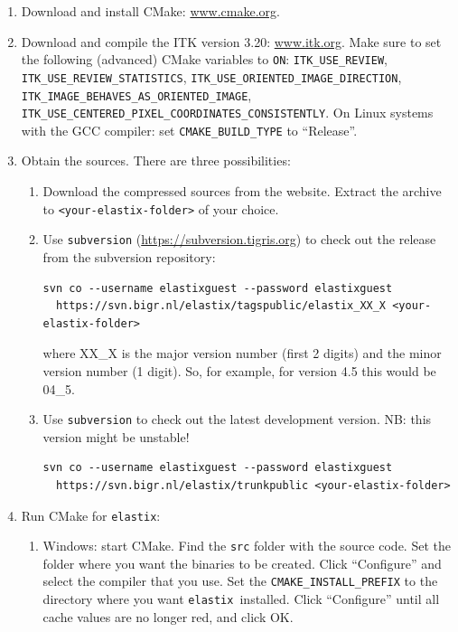 \documentclass[]{report}
\newcommand{\elastix}{\texttt{elastix}}
\begin{document}
\begin{enumerate}
\item Download and install CMake: \url{www.cmake.org}.

\item Download and compile the ITK version 3.20: \url{www.itk.org}.
Make sure to set the following (advanced) CMake variables to
\texttt{ON}: \texttt{ITK\_USE\_REVIEW},
\texttt{ITK\_USE\_REVIEW\_STATISTICS},
\texttt{ITK\_USE\_ORIENTED\_IMAGE\_DIRECTION},
\texttt{ITK\_IMAGE\_BEHAVES\_AS\_ORIENTED\_IMAGE},
\texttt{ITK\_USE\_CENTERED\_PIXEL\_COORDINATES\_CONSISTENTLY}. On
Linux systems with the GCC compiler: set \texttt{CMAKE\_BUILD\_TYPE}
to ``Release''.

\item Obtain the sources. There are three possibilities:
  \begin{enumerate}
  \item Download the compressed sources from the website. Extract the
      archive to \texttt{<your-elastix-folder>} of your choice.
  \item Use \texttt{subversion} (\url{https://subversion.tigris.org})
      to check out the release from the subversion repository:
\begin{verbatim}
svn co --username elastixguest --password elastixguest
  https://svn.bigr.nl/elastix/tagspublic/elastix_XX_X <your-elastix-folder>
\end{verbatim}
      where XX\_X is the major version number (first 2 digits) and the
      minor version number (1 digit). So, for example, for version 4.5
      this would be 04\_5.
  \item Use \texttt{subversion} to check out the latest development
      version. NB: this version might be unstable!
\begin{verbatim}
svn co --username elastixguest --password elastixguest
  https://svn.bigr.nl/elastix/trunkpublic <your-elastix-folder>
\end{verbatim}
  \end{enumerate}

\item Run CMake for \elastix:
    \begin{enumerate}
    \item Windows: start CMake. Find the \texttt{src} folder with the
        source code. Set the folder where you want the binaries to be
        created. Click ``Configure'' and select the compiler that you
        use. Set the \texttt{CMAKE\_INSTALL\_PREFIX} to the directory
        where you want \elastix\ installed. Click ``Configure'' until
        all cache values are no longer red, and click OK.


\end{enumerate}
\end{enumerate}
\end{document}
